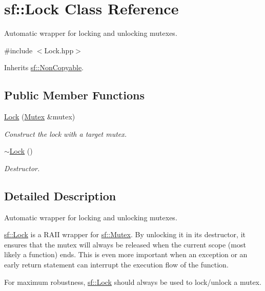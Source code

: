\hypertarget{classsf_1_1_lock}{\section{sf\+:\+:Lock Class Reference}
\label{classsf_1_1_lock}
}


Automatic wrapper for locking and unlocking mutexes.  




{\ttfamily \#include $<$Lock.\+hpp$>$}



Inherits \hyperlink{classsf_1_1_non_copyable}{sf\+::\+Non\+Copyable}.

\subsection*{Public Member Functions}
\begin{DoxyCompactItemize}
\item 
\hyperlink{classsf_1_1_lock_a1a4c5d7a15da61103d85c9aa7f118920}{Lock} (\hyperlink{classsf_1_1_mutex}{Mutex} \&mutex)
\begin{DoxyCompactList}\small\item\em Construct the lock with a target mutex. \end{DoxyCompactList}\item 
\hyperlink{classsf_1_1_lock_a8168b36323a18ccf5b6bc531d964aec5}{$\sim$\+Lock} ()
\begin{DoxyCompactList}\small\item\em Destructor. \end{DoxyCompactList}\end{DoxyCompactItemize}


\subsection{Detailed Description}
Automatic wrapper for locking and unlocking mutexes. 

\hyperlink{classsf_1_1_lock}{sf\+::\+Lock} is a R\+A\+I\+I wrapper for \hyperlink{classsf_1_1_mutex}{sf\+::\+Mutex}. By unlocking it in its destructor, it ensures that the mutex will always be released when the current scope (most likely a function) ends. This is even more important when an exception or an early return statement can interrupt the execution flow of the function.

For maximum robustness, \hyperlink{classsf_1_1_lock}{sf\+::\+Lock} should always be used to lock/unlock a mutex.

